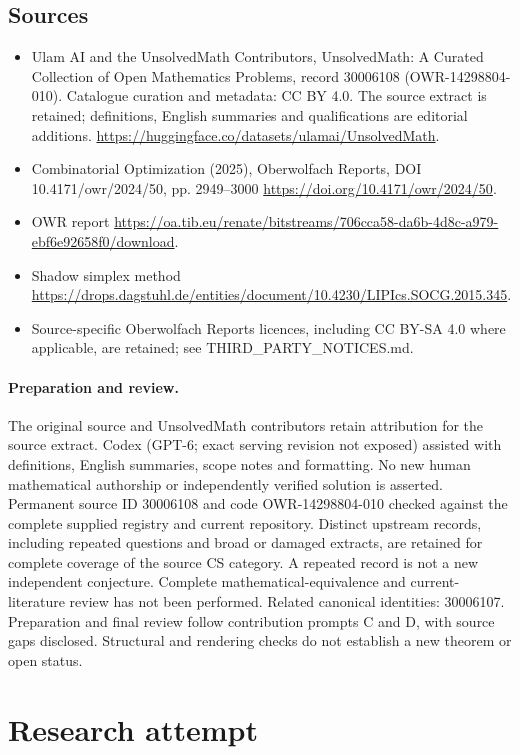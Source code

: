 \documentclass[11pt]{article}
\begin{document}
\subsection{Sources}
\begin{itemize}
\item[S1] Ulam AI and the UnsolvedMath Contributors, UnsolvedMath: A Curated Collection of Open Mathematics Problems, record 30006108 (OWR-14298804-010). Catalogue curation and metadata: CC BY 4.0. The source extract is retained; definitions, English summaries and qualifications are editorial additions.
\url{https://huggingface.co/datasets/ulamai/UnsolvedMath}.
\item[S2] Combinatorial Optimization (2025), Oberwolfach Reports, DOI 10.4171/owr/2024/50, pp. 2949--3000
\url{https://doi.org/10.4171/owr/2024/50}.
\item[S3] OWR report
\url{https://oa.tib.eu/renate/bitstreams/706cca58-da6b-4d8c-a979-ebf6e92658f0/download}.
\item[S4] Shadow simplex method
\url{https://drops.dagstuhl.de/entities/document/10.4230/LIPIcs.SOCG.2015.345}.
\item Source-specific Oberwolfach Reports licences, including CC BY-SA 4.0 where applicable, are retained; see THIRD\_PARTY\_NOTICES.md.
\end{itemize}
\paragraph{Preparation and review.}
The original source and UnsolvedMath contributors retain attribution for the source extract. Codex (GPT-6; exact serving revision not exposed) assisted with definitions, English summaries, scope notes and formatting. No new human mathematical authorship or independently verified solution is asserted. Permanent source ID 30006108 and code OWR-14298804-010 checked against the complete supplied registry and current repository. Distinct upstream records, including repeated questions and broad or damaged extracts, are retained for complete coverage of the source CS category. A repeated record is not a new independent conjecture. Complete mathematical-equivalence and current-literature review has not been performed. Related canonical identities: 30006107. Preparation and final review follow contribution prompts C and D, with source gaps disclosed. Structural and rendering checks do not establish a new theorem or open status.
\label{end:30006108}

\section{Research attempt}
\end{document}
